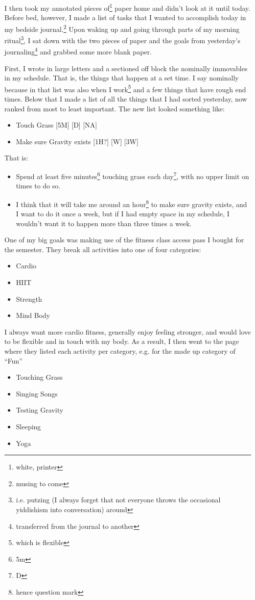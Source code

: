 \documentclass[12pt]{article}[titlepage]
\newcommand{\say}[1]{``#1''}
\renewcommand{\,}{\textsuperscript{,}}
\begin{document}
I then took my annotated pieces of\footnote{white, printer} paper home and didn't look at it until today.  
Before bed, however, I made a list of tasks that I wanted to accomplish today in my bedside journal.\footnote{musing to come}  
Upon waking up and going through parts of my morning ritual\footnote{i.e. putzing (I always forget that not everyone throws the occasional yiddishism into conversation) around}, I sat down with the two pieces of paper and the goals from yesterday's journaling\footnote{transferred from the journal to another} and grabbed some more blank paper.

First, I wrote in large letters and a sectioned off block the nominally immovables in my schedule.  
That is, the things that happen at a set time.  
I say nominally because in that list was also when I work\footnote{which is flexible} and a few things that have rough end times.  
Below that I made a list of all the things that I had sorted yesterday, now ranked from most to least important.  
The new list looked something like:  
\begin{itemize}  
\item Touch Grass [5M] [D] [NA]  
\item Make sure Gravity exists [1H?] [W] [3W]  
\end{itemize}  
That is:  
\begin{itemize}  
\item Spend at least five minutes\footnote{5m} touching grass each day\footnote{D}, with no upper limit on times to do so.  
\item I think that it will take me around an hour\footnote{hence question mark} to make sure gravity exists, and I want to do it once a week, but if I had empty space in my schedule, I wouldn't want it to happen more than three times a week.  
\end{itemize}

One of my big goals was making use of the fitness class access pass I bought for the semester.  
They break all activities into one of four categories:  
\begin{itemize}  
\item Cardio  
\item HIIT  
\item Strength  
\item Mind Body  
\end{itemize}

I always want more cardio fitness, generally enjoy feeling stronger, and would love to be flexible and in touch with my body.  
As a result, I then went to the page where they listed each activity per category, e.g. for the made up category of \say{Fun}  
\begin{itemize}  
\item Touching Grass  
\item Singing Songs  
\item Testing Gravity  
\item Sleeping  
\item Yoga  
\end{itemize}
\end{document}
